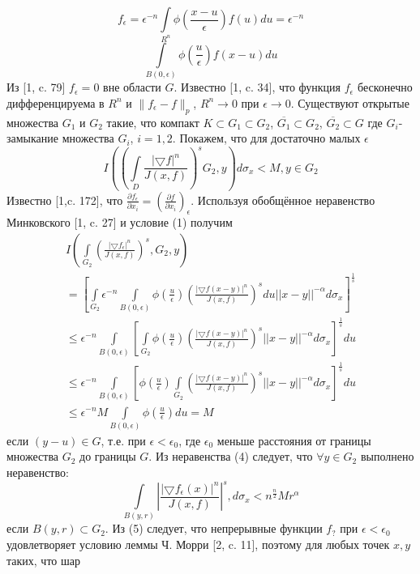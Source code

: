 $$
f_{\epsilon}=\epsilon^{-n}\int\limits_{R^n}\phi\left(\frac{x-u}{\epsilon}\right)f(u)du=\epsilon^{-n}$$
$$\int\limits_{B(0,\epsilon)}\phi\left(\frac{u}{\epsilon}\right)f(x-u)du
$$
Из [1, c. 79] $f_{\epsilon}=0$ вне области $G$. Известно [1, c. 34], что функция $f_{\epsilon}$ бесконечно дифференцируема в $R^n$ и $\|f_{\epsilon}-f\|_p$, $R^{n}\to 0$ при $\epsilon\to 0$. Существуют открытые множества $G_1$ и $G_2$ такие, что компакт $K\subset G_{1} \subset G_{2}$, $\overline{G_1}\subset G_{2}$, $\overline{G_2}\subset G$ где $G_i$- замыкание множества $G_i$, $i=1,2$.
 	Покажем, что для достаточно малых $\epsilon$
 	$$I\left(\left(
\int\limits_D\frac{|\bigtriangledown f|^{n}}{J(x,f)}
\right)^{s}G_{2},y\right) d\sigma_{x}<M, y\in G_2$$
Известно [1,c. 172], что $\frac{\partial f_\epsilon}{\partial x_i}=\left(\frac{\partial f}{\partial x_i}\right)_\epsilon$. Используя обобщённое неравенство Минковского [1, c. 27] и условие (1) получим
\begin{multline}
I\left(\int\limits_{G_2}\left(\frac{|\bigtriangledown f_{\epsilon}|^{n}}{J(x,f)}\right)^s, G_{2},y\right)\\
=\left[ \int\limits_{G_2}\epsilon^{-n}\int\limits_{B(0,\epsilon)}\phi\left(\frac{u}{\epsilon}\right)\left(\frac{|\bigtriangledown f(x-y)|^{n}}{J(x,f)}\right)^{s}
du||x-y||^{-\alpha}d\sigma_{x}\right]^{\frac{1}{s}}\\
\leq\epsilon^{-n}\int\limits_{B(0,\epsilon)}\left[\int\limits_{G_2}\phi\left(\frac{u}{\epsilon}\right)\left(\frac{|\bigtriangledown f(x-y)|^{n}}{J(x,f)}\right)^{s}||x-y||^{-\alpha}d\sigma_{x}\right]^{\frac{1}{s}}du
\\\leq\epsilon^{-n}\int\limits_{B(0,\epsilon)}\left[\phi\left(\frac{u}{\epsilon}\right)\int\limits_{G_2}\left(\frac{|\bigtriangledown f(x-y)|^{n}}{J(x,f)}\right)^{s}||x-y||^{-\alpha}d\sigma_{x}\right]^{\frac{1}{s}}du\\
\leq\epsilon^{-n}M\int\limits_{B(0,\epsilon)}\phi\left(\frac{u}{\epsilon}\right)du=M
\end{multline}
если $(y-u)\in G$, т.е. при $\epsilon<\epsilon_0$, где $\epsilon_0$ меньше расстояния от границы множества $G_2$ до границы $G$. Из неравенства (4) следует, что $\forall y\in G_2$ выполнено неравенство:
\begin{equation}
\int\limits_{B(y,r)}\left|\frac{|\bigtriangledown f_{\epsilon}(x)|^{n}}{J(x,f)}\right|^s, d\sigma_{x}<n^{\frac{n}{2}}Mr^\alpha
\end{equation}
если $B(y,r)\subset G_2$.
Из (5) следует, что непрерывные функции $f_?$ при $\epsilon<\epsilon_0$ удовлетворяет условию леммы Ч. Морри [2, c. 11], поэтому для любых точек $x, y$ таких, что шар
